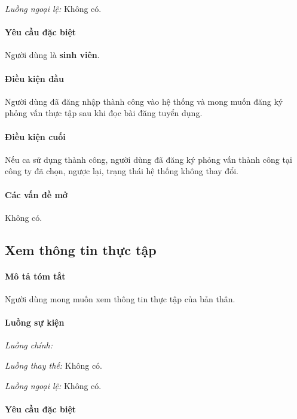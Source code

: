 \documentclass[./../main.tex]{subfiles}
\begin{document}
\emph{Luồng ngoại lệ:} Không có.

\paragraph*{Yêu cầu đặc biệt}

Người dùng là \textbf{sinh viên}.

\paragraph*{Điều kiện đầu}

Người dùng đã đăng nhập thành công vào hệ thống và mong muốn đăng ký
phỏng vấn thực tập sau khi đọc bài đăng tuyển dụng.

\paragraph*{Điều kiện cuối}

Nếu ca sử dụng thành công, người dùng đã đăng ký phỏng vấn thành công
tại công ty đã chọn, ngược lại, trạng thái hệ thống không thay đổi.

\paragraph*{Các vấn đề mở}

Không có.

\subsection{Xem thông tin thực tập}

\paragraph*{Mô tả tóm tắt}

Người dùng mong muốn xem thông tin thực tập của bản thân.

\paragraph*{Luồng sự kiện}

\emph{Luồng chính:}

\emph{Luồng thay thế:} Không có.

\emph{Luồng ngoại lệ:} Không có.

\paragraph*{Yêu cầu đặc biệt}
\end{document}
